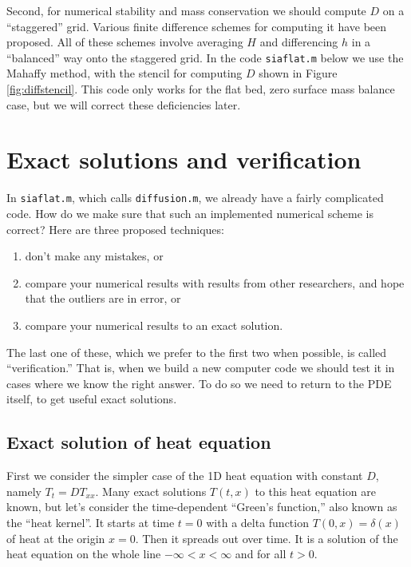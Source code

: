 \documentclass[letterpaper,final,12pt,reqno]{amsart}
\newcommand{\minput}[1]{
\vspace{0.8cm}
\VerbatimInput[frame=single,framesep=3mm,label=\fbox{\normalsize \textsl{\,#1.m\,}},fontfamily=courier,fontsize=\footnotesize]{../mfiles/#1.slim.m}
\vspace{0.5cm}
}
\begin{document}
Second, for numerical stability and mass conservation we should compute $D$ on a ``staggered'' grid.  Various finite difference schemes for computing it have been proposed.  All of these schemes involve averaging $H$ and differencing $h$ in a ``balanced'' way onto the staggered grid.  In the code \texttt{siaflat.m} below we use the Mahaffy \cite{Mahaffy} method, with the stencil for computing $D$ shown in Figure \ref{fig:diffstencil}.  This code only works for the flat bed, zero surface mass balance case, but we will correct these deficiencies later.

\minput{siaflat}


\section{Exact solutions and verification}

In \texttt{siaflat.m}, which calls \texttt{diffusion.m}, we already have a fairly complicated code.  How do we make sure that such an implemented numerical scheme is correct?  Here are three proposed techniques:
\begin{enumerate}
  \item don't make any mistakes, or
  \item compare your numerical results with results from other researchers, and hope that the outliers are in error, or
  \item compare your numerical results to an exact solution.   \end{enumerate}
The last one of these, which we prefer to the first two when possible, is called ``verification.''  That is, when we build a new computer code we should test it in cases where we know the right answer.  To do so we need to return to the PDE itself, to get useful exact solutions.

\subsection*{Exact solution of heat equation}  First we consider the simpler case of the 1D heat equation with constant $D$, namely $T_t = D T_{xx}$.  Many exact solutions $T(t,x)$ to this heat equation are known, but let's consider the time-dependent ``Green's function,'' also known as the ``heat kernel''.  It starts at time $t=0$ with a delta function $T(0,x)=\delta(x)$ of heat at the origin $x=0$.  Then it spreads out over time.  It is a solution of the heat equation on the whole line $-\infty<x<\infty$ and for all $t>0$.
\end{document}
